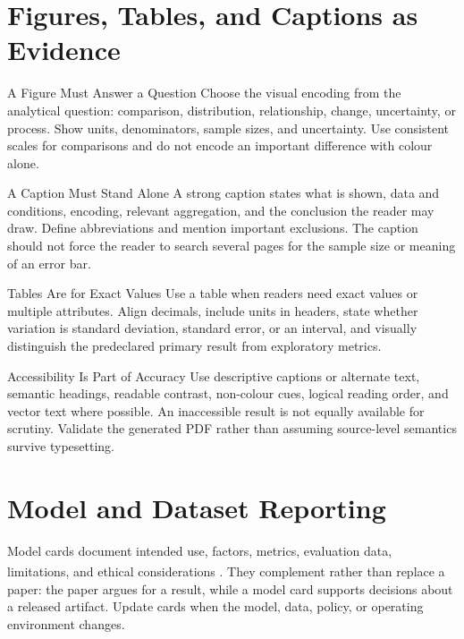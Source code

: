 \section{Figures, Tables, and Captions as Evidence}

\begin{v3topic}{A Figure Must Answer a Question}
Choose the visual encoding from the analytical question: comparison,
distribution, relationship, change, uncertainty, or process.
Show units, denominators, sample sizes, and uncertainty.
Use consistent scales for comparisons and do not encode an important
difference with colour alone.

\end{v3topic}
\begin{v3topic}{A Caption Must Stand Alone}
A strong caption states what is shown, data and conditions, encoding, relevant
aggregation, and the conclusion the reader may draw.
Define abbreviations and mention important exclusions.
The caption should not force the reader to search several pages for the sample
size or meaning of an error bar.

\end{v3topic}
\begin{v3topic}{Tables Are for Exact Values}
Use a table when readers need exact values or multiple attributes.
Align decimals, include units in headers, state whether variation is standard
deviation, standard error, or an interval, and visually distinguish the
predeclared primary result from exploratory metrics.

\end{v3topic}
\begin{v3topic}{Accessibility Is Part of Accuracy}
Use descriptive captions or alternate text, semantic headings, readable
contrast, non-colour cues, logical reading order, and vector text where
possible.
An inaccessible result is not equally available for scrutiny.
Validate the generated PDF rather than assuming source-level semantics survive
typesetting.
\end{v3topic}

\section{Model and Dataset Reporting}

Model cards document intended use, factors, metrics, evaluation data,
limitations, and ethical considerations
\textsuperscript{\cite{mitchellModelCardsModel2019}}.
They complement rather than replace a paper: the paper argues for a result,
while a model card supports decisions about a released artifact.
Update cards when the model, data, policy, or operating environment changes.

